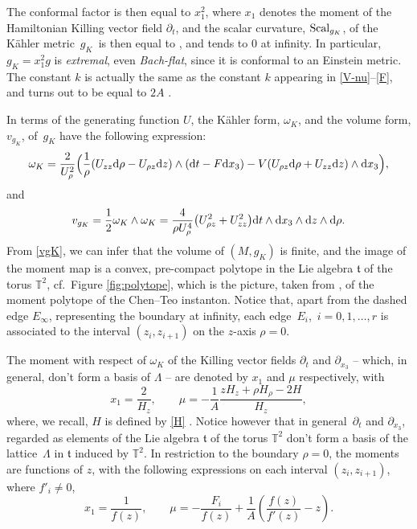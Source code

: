 \documentclass[pdftex]{sigma}
\numberwithin{equation}{section}
\begin{document}
The conformal factor  is then equal to $x _1 ^2$, where $x _1$ denotes the moment of the Hamiltonian Killing vector field $\partial _t$, and
the scalar curvature, ${\rm Scal} _{g_K}$, of the K\"ahler metric~$g _K$~is then equal to , and tends to $0$ at infinity. In particular, $g_K = x _1 ^2 g$ is {\it extremal}, even {\it Bach-flat}, since it is conformal to an Einstein metric. The constant $k$ is actually the same as the constant $k$ appearing in \eqref{V-nu}--\eqref{F}, and turns out to be equal to $2 A$ \cite[equation (89)]{BG}.

In terms of the generating function $U$, the K\"ahler form, $\omega _K$, and the volume form, $v _{g _K}$, of~$g_K$ have the following expression:
\[ \label{omega-K } \omega _K = \frac{2}{U_{\rho} ^2} \Big(\frac{1}{\rho} (U_{z z} {\rm d}\rho - U_{\rho z} {\rm d}z) \wedge ({\rm d}t - F {\rm d} x_3) - V (U_{\rho z} {\rm d} \rho + U_{z z} {\rm d}z) \wedge {\rm d} x _3\Big), \]
and
\begin{gather} \label{vgK} v _{g _K} = \frac{1}{2} \omega _K \wedge \omega _K = \frac{4}{\rho U_{\rho} ^4} \big(U_{\rho z} ^2 + U_{z z} ^2\big) {\rm d}t \wedge {\rm d} x _3 \wedge {\rm d} z \wedge {\rm d} \rho. \end{gather}
From \eqref{vgK}, we can infer that the volume of $(M, g _K)$ is finite, and the image of the moment map is a convex, pre-compact polytope in the Lie algebra $\mathfrak{t}$ of the torus $\mathbb{T} ^2$, cf.\ Figure \ref{fig:polytope}, which is the picture, taken from \cite[Section~8]{BG}, of the moment polytope of the Chen--Teo instanton. Notice that, apart from the dashed edge $E _{\infty}$, representing the boundary at infinity, each edge~$E _i$,~${i = 0, 1, \dots, r}$ is associated to the interval $(z _i, z _{i + 1})$ on the $z$-axis $\rho = 0$.

The moment with respect of $\omega _K$ of the Killing vector fields $\partial _t$ and $\partial _{x_3}$ -- which, in general, don't form a basis of $\Lambda$ -- are denoted by $x _1$ and $\mu$ respectively, with
\[%
 x _1 = \frac{2}{H_z}, \qquad \mu = - \frac{1}{A} \frac{z H _z + \rho H_{\rho} - 2 H}{H_z}, \]
where, we recall, $H$ is defined by \eqref{H} \cite[Proposition 6.1]{BG}. Notice however that in general~$\partial _t$ and $\partial _{x_3}$, regarded as elements of the Lie algebra $\mathfrak{t}$ of the torus $\mathbb{T} ^2$ don't form a basis of the lattice~$\Lambda$ in $\mathfrak{t}$ induced by $\mathbb{T} ^2$. In restriction to the boundary $\rho = 0$, the moments are functions of $z$, with the following expressions on each interval $(z _i, z _{i + 1})$, where $f'_i \neq 0$,
\[%
 x_1 = \frac{1}{f (z)}, \qquad \mu = - \frac{F_i}{f (z)} + \frac{1}{A} \left(\frac{f (z)}{f' (z)} - z\right). \]
\end{document}

